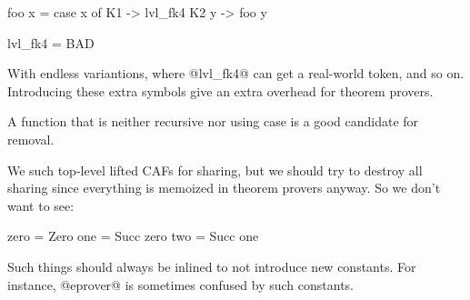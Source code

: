 \begin{code}
foo x = case x of
    K1 -> lvl_fk4
    K2 y -> foo y

lvl_fk4 = BAD
\end{code}

With endless variantions, where @lvl_fk4@ can get a real-world token,
and so on. Introducing these extra symbols give an extra overhead for
theorem provers.

A function that is neither recursive nor using case is a good
candidate for removal.

We such top-level lifted CAFs for sharing, but we should
try to destroy all sharing since everything is memoized in
theorem provers anyway. So we don't want to see:

\begin{code}
zero = Zero
one = Succ zero
two = Succ one
\end{code}

Such things should always be inlined to not introduce new constants.
For instance, @eprover@ is sometimes confused by such constants.

